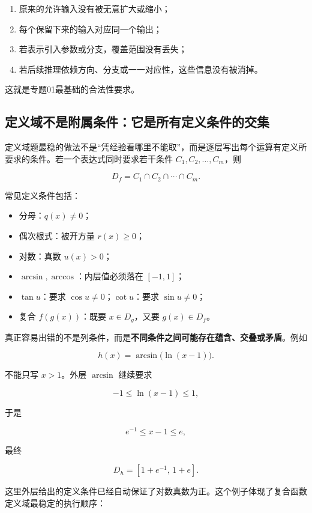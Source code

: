 \documentclass[11pt,a4paper]{ctexart}
\providecommand{\tightlist}{}
\begin{document}
\begin{enumerate}
\def\labelenumi{\arabic{enumi}.}
\tightlist
\item
  原来的允许输入没有被无意扩大或缩小；
\item
  每个保留下来的输入对应同一个输出；
\item
  若表示引入参数或分支，覆盖范围没有丢失；
\item
  若后续推理依赖方向、分支或一一对应性，这些信息没有被消掉。
\end{enumerate}

这就是专题01最基础的合法性要求。

\subsection{定义域不是附属条件：它是所有定义条件的交集}

定义域题最稳的做法不是``凭经验看哪里不能取''，而是逐层写出每个运算有定义所要求的条件。若一个表达式同时要求若干条件
\(C_1,C_2,\ldots,C_m\)，则

\[
\boxed{
D_f=C_1\cap C_2\cap\cdots\cap C_m.
}
\]

常见定义条件包括：

\begin{itemize}
\tightlist
\item
  分母：\(q(x)\ne0\)；
\item
  偶次根式：被开方量 \(r(x)\ge0\)；
\item
  对数：真数 \(u(x)>0\)；
\item
  \(\arcsin,\arccos\)：内层值必须落在 \([-1,1]\)；
\item
  \(\tan u\)：要求 \(\cos u\ne0\)；\(\cot u\)：要求 \(\sin u\ne0\)；
\item
  复合 \(f(g(x))\)：既要 \(x\in D_g\)，又要 \(g(x)\in D_f\)。
\end{itemize}

真正容易出错的不是列条件，而是\textbf{不同条件之间可能存在蕴含、交叠或矛盾}。例如

\[
h(x)=\arcsin\bigl(\ln(x-1)\bigr).
\]

不能只写 \(x>1\)。外层 \(\arcsin\) 继续要求

\[
-1\le\ln(x-1)\le1,
\]

于是

\[
e^{-1}\le x-1\le e,
\]

最终

\[
\boxed{D_h=[1+e^{-1},\,1+e].}
\]

这里外层给出的定义条件已经自动保证了对数真数为正。这个例子体现了复合函数定义域最稳定的执行顺序：
\end{document}
